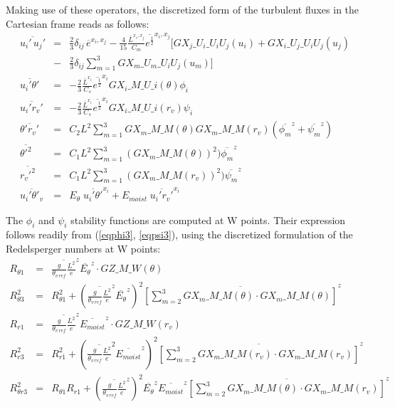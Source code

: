 \smallskip
Making use of these operators, the discretized form of the turbulent
fluxes in the Cartesian frame reads as follows:
\begin{eqnarray}
\overline{u_i'\,u_j'}&=&\frac{2}{3}\delta_{ij}\,\overline{e}^{x_i,x_j}
 -\frac{4}{15} \frac{\overline{L}^{x_i,x_j}}{C_m} \overline{e^
{\frac{1}{2}}}^{x_i,x_j}
[ GX_j\_U_i\_U_iU_j(u_i)+GX_i\_U_j\_U_iU_j(u_j)\nonumber \\
&-&\frac{2}{3}\delta_{ij}\sum_{m=1}^{3} GX_m\_U_m\_U_iU_j(u_m) ] \\
\overline{u_i'\theta'}&=&-\frac{2}{3}\frac{\overline{L}^{x_i}}{C_s}
\overline{e^{\frac{1}{2}}}^{x_i}
GX_i\_M\_U\_i(\theta) \phi_i\\
\overline{u_i'r_v'}&=&-\frac{2}{3}\frac{\overline{L}^{x_i}}{C_s}
\overline{e^{\frac{1}{2}}}^{x_i}
GX_i\_M\_U\_i(r_v) \psi_i\\
\overline{\theta'r_v'}&=&C_2 L^2
\sum_{m=1}^{3}GX_m\_M\_M(\theta)GX_m\_M\_M(r_v)(\overline{\phi_m}^z
+\overline{\psi_m}^z)\\
\overline{\theta'^2}&=&C_1 L^2
\sum_{m=1}^{3}(GX_m\_M\_M(\theta))^2)\overline{\phi_m}^z\\
\overline{r_v'^2}&=&C_1 L^2
\sum_{m=1}^{3}(GX_m\_M\_M(r_v))^2)\overline{\psi_m}^z\\
\overline{u_i'\theta'_v}&=& E_{\theta} \; \overline{u_i'\theta'}^{x_i}
+ E_{moist} \; \overline{u_i' r_v'}^{x_i}
\end{eqnarray}

\smallskip
The $\phi_i$ and $\psi_i$ stability functions are computed at W points. Their
expression follows readily from (\ref{eqphi3}, \ref{eqpsi3}), using the
discretized formulation of the Redelsperger numbers at W points:
\begin{eqnarray}
R_{\theta 1}&=&\overline{\frac{g}{\theta_{v\, ref}}\frac{L^2}{e}}^z
\overline{E_{\theta}}^z \cdot GZ\_M\_W(\theta)\\
R_{\theta 3}^2&=&R_{\theta 1}^2+
(\overline{\frac{g}{\theta_{v\,ref}}\frac{L^2}{e}}^z
\overline{E_{\theta}}^z)^2
\overline{[\sum_{m=2}^3GX_m\_M\_M(\theta)\cdot GX_m\_M\_M(\theta)]}^z\\
R_{r 1}&=&\overline{\frac{g}{\theta_{v\, ref}}\frac{L^2}{e}}^z
\overline{E_{moist}}^z \cdot GZ\_M\_W(r_v)\\
R_{r 3}^2&=&R_{r 1}^2+
(\overline{\frac{g}{\theta_{v\, ref}}\frac{L^2}{e}}^2
\overline{E_{moist}}^z)^2
\overline{[\sum_{m=2}^3GX_m\_M\_M(r_v)\cdot GX_m\_M\_M(r_v)]}^z\\
R_{\theta r 3}^2&=&R_{\theta 1}R_{r 1} +
(\overline{\frac{g}{\theta_{v\, ref}}\frac{L^2}{e}}^z)^2
\overline{E_{\theta}}^z \overline{E_{moist}}^z
\overline{[\sum_{m=2}^3 GX_m\_M\_M(\theta)\cdot GX_m\_M\_M(r_v)]}^z
\end{eqnarray}


